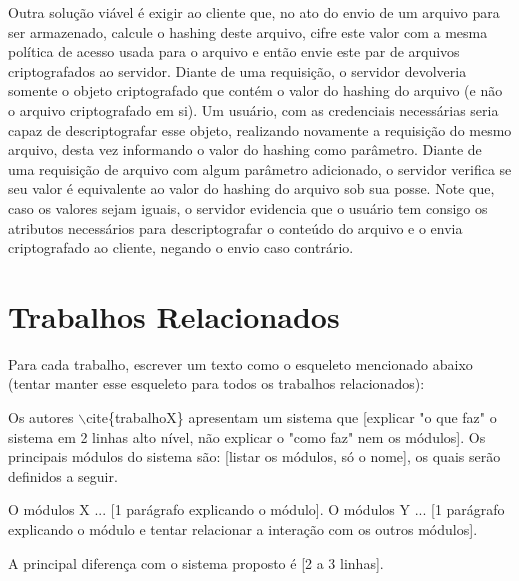 \documentclass[a4paper,11pt]{article}
\begin{document}
Outra solução viável é exigir ao cliente que, no ato do envio de um arquivo para ser armazenado, calcule o hashing deste arquivo, cifre este valor com a mesma política de acesso usada para o arquivo e então envie este par de arquivos criptografados ao servidor.
Diante de uma requisição, o servidor devolveria somente o objeto criptografado que contém o valor do hashing do arquivo (e não o arquivo criptografado em si).
Um usuário, com as credenciais necessárias seria capaz de descriptografar esse objeto, realizando novamente a requisição do mesmo arquivo, desta vez informando o valor do hashing como parâmetro.
Diante de uma requisição de arquivo com algum parâmetro adicionado, o servidor verifica se seu valor é equivalente ao valor do hashing do arquivo sob sua posse. Note que, caso os valores sejam iguais, o servidor evidencia que o usuário tem consigo os atributos necessários para descriptografar o conteúdo do arquivo e o envia criptografado ao cliente, negando o envio caso contrário.

\newpage
\section{Trabalhos Relacionados}

{\color{ForestGreen} Para cada trabalho, escrever um texto como o esqueleto mencionado abaixo (tentar manter esse esqueleto para todos os trabalhos relacionados):

Os autores  $\backslash$cite\{trabalhoX\} apresentam um sistema que [explicar "o que faz" o sistema em 2 linhas alto nível, não explicar o "como faz" nem os módulos]. Os principais módulos do sistema são: [listar os módulos, só o nome], os quais serão definidos a seguir.

O módulos X ... [1 parágrafo explicando o módulo].
O módulos Y ... [1  parágrafo explicando o módulo e tentar relacionar a interação com os outros módulos].

A principal diferença com o sistema proposto é [2 a 3 linhas].}
\end{document}
